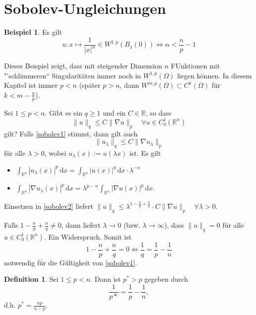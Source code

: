 \documentclass[
paper=a4,
bibtotocnumbered,
liststotocnumbered,
tablecaptionabove,
pointlessnumbers,
twoside,
openright,
10pt
]
{report}
\theoremstyle{definition}
\newtheorem*{df}{Definition}
\newtheorem*{bsp}{Beispiel}
\numberwithin{equation}{chapter}
\begin{document}
\section{Sobolev-Ungleichungen}
\begin{bsp}
	Es gilt
	\begin{equation}
		u: x \mapsto \frac{1}{|x|^\alpha} \in W^{1,p}(B_1(0)) \iff \alpha < \frac{n}{p}-1
	\end{equation}
\end{bsp}
Dieses Beispiel zeigt, dass mit steigender Dimension $n$ FUnktionen mit "'schlimmeren`` Singularitäten immer noch in $W^{1,p}(\Omega)$ liegen können. In diesem Kapitel ist immer $p<n$ (später $p>n$, dann $W^{m,p}(\Omega) \subset C^k(\Omega)$ für $k<m-\frac{n}{p}$).

Sei $1\le p <n$. Gibt es ein $q\ge 1$ und ein $C\in \mathbb R$, so dass
\begin{equation}\label{sobolev1}
\| u\|_q \le C \| \nabla u \|_p \quad \forall u\in C_0^1(\mathbb R^n)
\end{equation}
gilt?  Falls \eqref{sobolev1} stimmt, dann gilt auch 
\begin{equation}\label{sobolev2}
\| u_\lambda\|_q \le C \| \nabla u_\lambda\|_p
\end{equation}
für alle $\lambda>0$, wobei $u_\lambda(x):= u(\lambda x)$ ist. Es gilt
\begin{itemize}
\item $\int_{\mathbb R^n} |u_\lambda(x)|^p \, \mathrm dx = \int_{\mathbb R^n} |u(x)|^q \, \mathrm dx \cdot \lambda^{-n}$\\
\item $\int_{\mathbb R^n} |\nabla u_\lambda(x)|^p \, \mathrm dx = \lambda^{p-n} \int_{\mathbb R^n} |\nabla u(x)|^p \, \mathrm dx$.
\end{itemize}
Einsetzen in \eqref{sobolev2} liefert $\| u\|_q \le \lambda^{1-\frac{n}{p} + \frac{n}{q}} \cdot C \| \nabla u \|_p \quad \forall \lambda>0$.

Falls $1-\frac{n}{p} + \frac{n}{q} \neq 0$, dann liefert $\lambda \to 0$ (bzw. $\lambda \to \infty$), dass $\| u\|_q=0$ für alle $u\in C_0^1(\mathbb R^n)$. Ein Widerspruch. Somit ist
\begin{equation}
	1- \frac{n}{p} + \frac{n}{q}=0 \iff \frac{1}{q}=\frac{1}{p} - \frac{1}{n}
\end{equation}
notwendig für die Gültigkeit von \eqref{sobolev1}. 
\begin{df}
Sei $1\le p <n$. Dann ist $p^* >p$ gegeben durch
\begin{equation}
	\frac{1}{p*}= \frac{1}{p} - \frac{1}{n},
\end{equation}
d.h. $p^* = \frac{np}{n-p}$.
\end{df}
\end{document}
